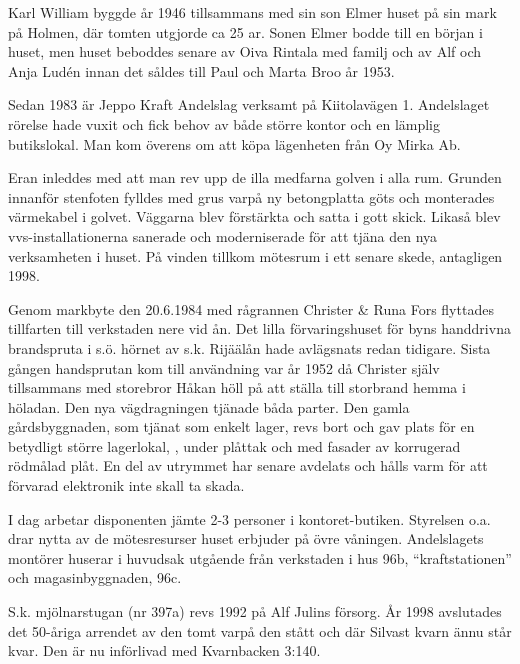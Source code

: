 Karl William byggde år 1946 tillsammans med sin son Elmer huset på sin mark på Holmen, där tomten utgjorde ca 25 ar. Sonen Elmer bodde till en början i huset, men huset beboddes senare av Oiva Rintala med familj och av Alf och Anja Ludén innan det såldes till Paul och Marta Broo år 1953.






Sedan 1983 är Jeppo Kraft Andelslag verksamt på Kiitolavägen 1. Andelslaget rörelse hade vuxit och fick behov av både större kontor och en lämplig butikslokal. Man kom överens om att köpa lägenheten från Oy Mirka Ab.

Eran inleddes med att man rev upp de illa medfarna golven i alla rum. Grunden innanför stenfoten fylldes med grus varpå ny betongplatta göts och monterades värmekabel i golvet. Väggarna blev förstärkta och satta i gott skick. Likaså blev vvs-installationerna sanerade och moderniserade för att tjäna den nya verksamheten i huset. På vinden tillkom mötesrum i ett senare skede, antagligen 1998.

Genom markbyte den 20.6.1984 med rågrannen Christer \& Runa Fors flyttades tillfarten till verkstaden nere vid ån. Det lilla förvaringshuset för byns handdrivna brandspruta i s.ö. hörnet av s.k. Rijäälån hade avlägsnats redan tidigare. Sista gången handsprutan kom till användning var år 1952 då Christer själv tillsammans med storebror Håkan höll på att ställa till storbrand hemma i höladan. Den nya vägdragningen tjänade båda parter. Den gamla gårdsbyggnaden, som tjänat som enkelt lager, revs bort och gav plats för en betydligt större lagerlokal, , under plåttak och med fasader av korrugerad rödmålad plåt. En del av utrymmet har senare avdelats och hålls varm för att förvarad elektronik inte skall ta skada.

I dag arbetar disponenten jämte 2-3 personer i kontoret-butiken. Styrelsen o.a. drar nytta av de mötesresurser huset erbjuder på övre 	våningen. Andelslagets montörer huserar i huvudsak utgående från verkstaden i hus 96b, ``kraftstationen'' och magasinbyggnaden, 96c.

S.k. mjölnarstugan (nr 397a) revs 1992 på Alf Julins försorg. År 1998 avslutades det 50-åriga arrendet av den tomt varpå den stått och där Silvast kvarn ännu står kvar. Den är nu införlivad med Kvarnbacken 3:140.


